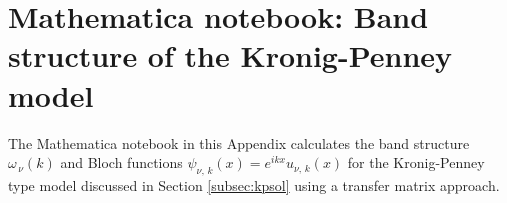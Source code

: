 \chapter{Mathematica notebook: Band structure of the Kronig-Penney model} \label{ch:appendix_mathematica}
%
\noindent
The Mathematica notebook in this Appendix calculates the band structure $\omega_{\,\nu}(k)$
and Bloch functions $\psi_{\nu,\,k}(x) = e^{i k x} u_{\nu,\,k}(x)$ for the Kronig-Penney type model 
discussed in Section \ref{subsec:kpsol} using a transfer matrix approach.
